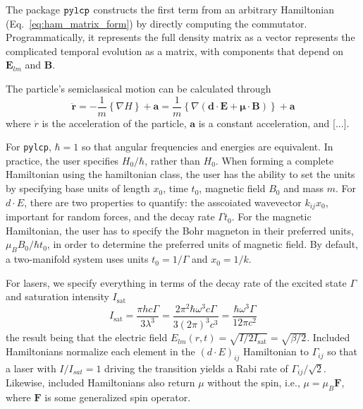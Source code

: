 \documentclass[final,5p,times,twocolumn]{elsarticle}
\newcounter{bla}
\begin{document}
The package ${\tt pylcp}$ constructs the first term from an arbitrary Hamiltonian (Eq.~\ref{eq:ham_matrix_form}) by directly computing the commutator.  Programmatically, it  represents the full density matrix as a vector represents the complicated temporal evolution as a matrix, with components that depend on $\mathbf{E}_{lm}$ and $\mathbf{B}$.

The particle's semiclassical motion can be calculated through
\begin{equation}
	\ddot{\mathbf{r}} = -\frac{1}{m} \left\{\nabla H\right\} + \mathbf{a} = \frac{1}{m}\left\{\nabla (\mathbf{d} \cdot \mathbf{E} + \mathbf{\mu}\cdot \mathbf{B})\right\} + \mathbf{a}
\end{equation}
where $\ddot{r}$ is the acceleration of the particle, $\mathbf{a}$ is a constant acceleration, and [...].

For {\tt pylcp}, $\hbar=1$ so that angular frequencies and energies are equivalent.  In practice, the user specifies $H_0/\hbar$, rather than $H_0$. 
When forming a complete Hamiltonian using the hamiltonian class, the user has
the ability to set the units by specifying base units of length $x_0$, time
$t_0$, magnetic field $B_0$ and mass $m$.  For $d\cdot E$, there are two properties
to quantify: the asscoiated wavevector $k_{ij}x_0$, important for random forces, 
and the decay rate $\Gamma t_0$.  For the magnetic Hamiltonian, the user has to 
specify the Bohr magneton in their preferred units, $\mu_B B_0/\hbar t_0$, in 
order to determine the preferred units of magnetic field.  By default, a two-manifold system uses units $t_0=1/\Gamma$ and $x_0=1/k$. 

For lasers, we specify everything in terms of the decay rate of the excited state $\Gamma$ and saturation intensity $I_\text{sat}$
\begin{equation}
    I_\text{sat} = \frac{\pi h c \Gamma}{3\lambda^3} = \frac{2\pi^2 \hbar \omega^3 c \Gamma}{3(2\pi)^3 c^3} = \frac{\hbar \omega^3 \Gamma}{12 \pi c^2}
\end{equation}
the result being that the electric field $E_{lm}(r,t) = \sqrt{I/2I_\text{sat}} = \sqrt{\beta/2}$.
Included Hamiltonians normalize each element in the $(d\cdot E)_{ij}$ Hamiltonian
to $\Gamma_{ij}$ so that a laser with $I/I_{sat}=1$ driving the transition
yields a Rabi rate of $\Gamma_{ij}/\sqrt{2}$.  Likewise, included Hamiltonians
also return $\mu$ without the spin, i.e., $\mu = \mu_B \mathbf{F}$, where
$\mathbf{F}$ is some generalized spin operator.
\end{document}
